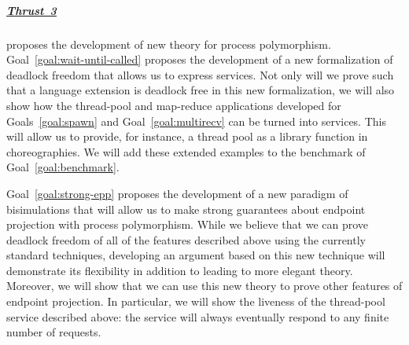 \subparagraph{\hyperref[sec:t3]{Thrust~3}} proposes the development of new theory for process polymorphism.
Goal~\ref{goal:wait-until-called} proposes the development of a new formalization of deadlock freedom that allows us to express services.
Not only will we prove such that a language extension is deadlock free in this new formalization, we will also show how the thread-pool and map-reduce applications developed for Goals~\ref{goal:spawn} and Goal~\ref{goal:multirecv} can be turned into services.
This will allow us to provide, for instance, a thread pool as a library function in choreographies.
We will add these extended examples to the benchmark of Goal~\ref{goal:benchmark}.

Goal~\ref{goal:strong-epp} proposes the development of a new paradigm of bisimulations that will allow us to make strong guarantees about endpoint projection with process polymorphism.
While we believe that we can prove deadlock freedom of all of the features described above using the currently standard techniques, developing an argument based on this new technique will demonstrate its flexibility in addition to leading to more elegant theory.
Moreover, we will show that we can use this new theory to prove other features of endpoint projection.
In particular, we will show the liveness of the thread-pool service described above: the service will always eventually respond to any finite number of requests.

